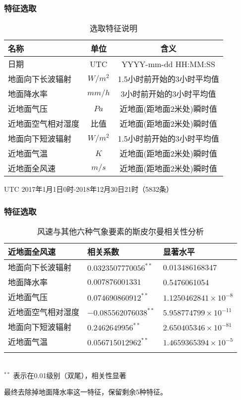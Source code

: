 \documentclass[14pt, AutoFakeBold]{ppt}
\begin{document}
\begin{frame}
  \frametitle{特征选取}
  \begin{table}[H]
    \centering
    \caption{选取特征说明\cite{6bab74c1-f2dd-4e24-a833-81f33bedf9b1}}
    \begin{tabular}{lcc}
    \toprule
    名称 & 单位 & 含义 \\
    \midrule
    日期 & UTC & YYYY-mm-dd HH:MM:SS \\
    地面向下长波辐射 & $W/m^2$ & 1.5小时前开始的3小时平均值 \\
    地面降水率 & $mm/h$ & 3小时前开始的3小时平均值 \\
    近地面气压 & $Pa$ & 近地面(距地面2米处)瞬时值 \\
    近地面空气相对湿度 & 比值 & 近地面(距地面2米处)瞬时值 \\
    地面向下短波辐射 & $W/m^2$ & 1.5小时前开始的3小时平均值 \\
    近地面气温 & $K$ & 近地面(距地面2米处)瞬时值 \\
    近地面全风速 & $m/s$ & 近地面(距地面2米处)瞬时值 \\
    \bottomrule
    \end{tabular}
    \label{features}
\end{table}
UTC 2017年1月1日0时-2018年12月30日21时（5832条）
\end{frame}

\begin{frame}
  \frametitle{特征选取}
  \begin{table}[H]
    \centering
    \caption{风速与其他六种气象要素的斯皮尔曼相关性分析}
    \begin{tabular}{lll}
    \toprule
    近地面全风速 & 相关系数 & 显著水平 \\
    \midrule
    地面向下长波辐射 & $0.0323507770056^{**}$ & 0.013486168347 \\
    地面降水率 & $0.007876001331$ & 0.5476061054 \\
    近地面气压 & $0.074690860912^{**}$ & $1.1250462841\times10^{-8}$ \\
    近地面空气相对湿度 & $-0.085562076038^{**}$ & $5.958774799\times10^{-11}$ \\
    地面向下短波辐射 & $0.2462649956^{**}$ & $2.650405346\times10^{-81}$ \\
    近地面气温 & $0.056715012962^{**}$ & $1.4659365394\times10^{-5}$ \\
    \bottomrule \\
    \end{tabular} \\
    \footnotesize{$^{**}$ 表示在0.01级别（双尾），相关性显著} \\
    \label{relativity-analysis}
\end{table}
最终去除掉地面降水率这一特征，保留剩余5种特征。
\end{frame}
\end{document}

